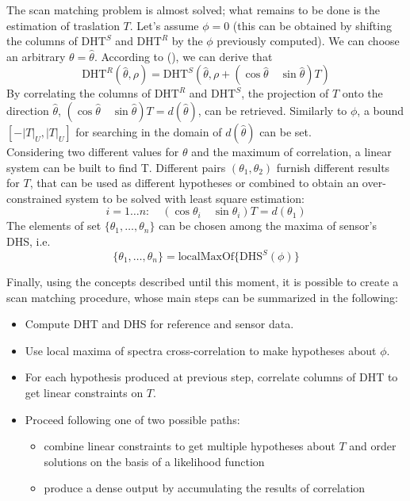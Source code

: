 \documentclass[a4paper, onecolumn]{report}
\begin{document}
The scan matching problem is almost solved; what remains to be done is the estimation of traslation $T$. Let's assume $\phi=0$ (this can be obtained by shifting the columns of $\mbox{DHT}^S$ and $\mbox{DHT}^R$ by the $\phi$ previously computed). We can choose an arbitrary $\theta = \hat{\theta}$. According to (), we can derive that
\begin{equation}
	\mbox{DHT}^R(\hat \theta, \rho) = \mbox{DHT}^S(\hat \theta, \rho + (\cos \hat \theta \quad \sin\hat\theta)T)
\end{equation}
By correlating the columns of $\mbox{DHT}^R$ and $\mbox{DHT}^S$, the projection of $T$ onto the direction $\hat\theta$, $(\cos\hat\theta \quad \sin\hat\theta)T = d(\hat\theta)$, can be retrieved. Similarly to $\phi$,  a bound $[-|T|_U, |T|_U]$ for searching in the domain of $d(\hat\theta)$ can be set.\\
Considering two different values for $\theta$ and the maximum of correlation, a linear system can be built to find T. Different pairs $(\theta_1, \theta_2)$ furnish different results for $T$, that can be used as different hypotheses or combined to obtain an over-constrained system to be solved with least square estimation:
\begin{equation}
	i = 1 \dots n: \quad (\cos\theta_i \quad \sin\theta_i)T = d(\theta_1)
\end{equation}
The elements of set $\{\theta_1,\dots,\theta_n\}$ can be chosen among the maxima of sensor's DHS, i.e. 
\begin{equation}
	\{\theta_1,\dots,\theta_n\} = \mbox{localMaxOf}\{\mbox{DHS}^S(\phi)\}
\end{equation}

Finally, using the concepts described until this moment, it is possible to create a scan matching procedure, whose main steps can be summarized in the following:
\begin{itemize}
	\item{Compute DHT and DHS for reference and sensor data.}
	\item{Use local maxima of spectra cross-correlation to make hypotheses about $\phi$.}
	\item{For each hypothesis produced at previous step, correlate columns of DHT to get linear constraints on $T$.}
	\item{Proceed following one of two possible paths:}
		\begin{itemize}
			\item{combine linear constraints to get multiple hypotheses about $T$ and order solutions on the basis of a likelihood function}
			\item{produce a dense output by accumulating the results of correlation}
		\end{itemize}
\end{itemize}
\end{document}
